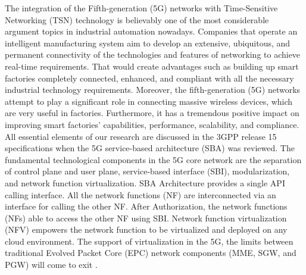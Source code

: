 The integration of the Fifth-generation (5G) networks with
Time-Sensitive Networking (TSN) technology is believably one of the most considerable argument topics in industrial automation nowadays. Companies that operate an intelligent manufacturing system aim to develop an extensive, ubiquitous, and permanent connectivity of the technologies and features of networking to achieve real-time requirements. That would create advantages such as building up smart factories completely connected, enhanced, and compliant with all the necessary industrial technology requirements. Moreover, the fifth-generation (5G) networks attempt to play a significant role in connecting massive wireless devices, which are very useful in factories.
Furthermore, it has a tremendous positive impact on improving smart factories' capabilities, performance, scalability, and compliance.
All essential elements of our research are discussed in the 3GPP release 15 specifications when the 5G service-based architecture (SBA) was reviewed. The fundamental technological components in the 5G core network are the separation of control plane and user plane, service-based interface (SBI), modularization, and network function virtualization. SBA Architecture provides a single API calling interface.  All the network functions (NF) are interconnected via an interface for calling the other NF. 
After Authorization, the network functions (NFs) able to access the other NF using SBI. Network function virtualization (NFV) empowers the network function to be virtualized and deployed on any cloud environment. The support of virtualization in the 5G, the limits between traditional Evolved Packet Core (EPC) network components (MME, SGW, and PGW) will come to exit \cite{5G_Tech_Spec_Group_Ser2018study}.

